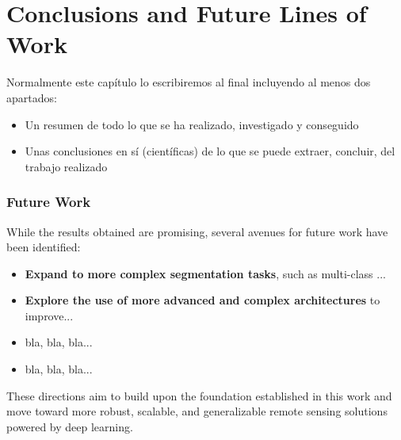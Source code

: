 
\chapter{Conclusions and Future Lines of Work} \label{chap:Conclusions} 
Normalmente este capítulo lo escribiremos al final incluyendo al menos dos apartados: 


\begin{itemize}
    \item Un resumen de todo lo que se ha realizado, investigado y conseguido
    \item Unas conclusiones en sí (científicas) de lo que se puede extraer, concluir, del trabajo realizado
\end{itemize}

\subsection{Future Work}
While the results obtained are promising, several avenues for future work have been identified:

\begin{itemize}
    \item \textbf{Expand to more complex segmentation tasks}, such as multi-class ...

    \item \textbf{Explore the use of more advanced and complex architectures} to improve...

    \item bla, bla, bla...
    \item bla, bla, bla...
\end{itemize}

These directions aim to build upon the foundation established in this work and move toward more robust, scalable, and generalizable remote sensing solutions powered by deep learning.